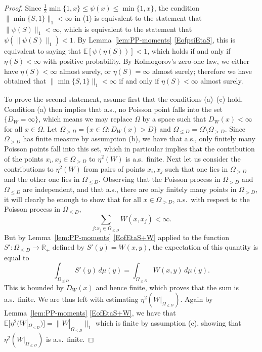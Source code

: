 \documentclass{amsart}
\numberwithin{equation}{section}
\numberwithin{figure}{section}
\theoremstyle{definition}
\theoremstyle{remark}
\newcommand{\EE}{\mathbb{E}}
\newcommand{\RR}{\mathbb{R}}
\begin{document}
\begin{proof}
Since $\frac 12\min\{1,x\}\leq \psi(x)\leq \min\{1,x\}$, the condition
$\|\min\{S,1\}\|_1<\infty$ in (1) is equivalent to the statement that
$\|\psi(S)\|_1<\infty$, which is equivalent to the statement that
$\psi(\|\psi(S)\|_1)<1$. By Lemma~\ref{lem:PP-moments} \eqref{EofpsiEtaS},
this is equivalent to saying that $\EE[\psi(\eta(S))]<1$, which holds if and
only if $\eta(S)<\infty$ with positive probability. By Kolmogorov's zero-one
law, we either have $\eta(S)<\infty$ almost surely, or $\eta(S)=\infty$
almost surely; therefore we have obtained that $\|\min\{S,1\}\|_1<\infty$ if
and only if $\eta(S)<\infty$ almost surely.

To prove the second statement, assume first that the conditions (a)--(c)
hold. Condition (a) then implies that a.s., no Poisson point falls into the
set $\{D_W=\infty\}$, which means we may replace $\Omega$ by a space such
that $D_W(x)<\infty$ for all $x\in \Omega$. Let $\Omega_{>D}=\{x\in\Omega:
D_W(x)>D\}$ and $\Omega_{\leq D}=\Omega\setminus\Omega_{>D}$. Since
$\Omega_{>D}$ has finite measure by assumption (b), we have that a.s., only
finitely many Poisson points fall into this set, which in particular implies
that the contribution of the points $x_i,x_j\in \Omega_{>D}$ to $\eta^2(W)$
is a.s.\ finite. Next let us consider the contributions to $\eta^2(W)$ from
pairs of points $x_i,x_j$ such that one lies in $\Omega_{>D}$ and the other
one lies in $\Omega_{\leq D}$. Observing that the Poisson process in
$\Omega_{>D}$ and $\Omega_{\leq D}$ are independent, and that a.s., there are
only finitely many points in $\Omega_{>D}$, it will clearly be enough to show
that for all $x\in \Omega_{>D}$, a.s.\ with respect to the Poisson process in
$\Omega_{\leq D}$,
\[
\sum_{j: x_j\in \Omega_{\leq D}} W(x,x_j)<\infty.
\]
But by Lemma~\ref{lem:PP-moments} \eqref{EofEtaS+W} applied to the function
$S'\colon\Omega_{\leq D} \rightarrow \RR_+$ defined by $S'(y)=W(x,y)$, the
expectation of this quantity is equal to
\[
\int_{\Omega_{\leq D}}S'(y) \,d\mu(y)=\int_{\Omega_{\leq D}}W(x,y)\,d\mu(y).
\]
This is bounded by $D_W(x)$ and hence finite, which proves that the sum is
a.s.\ finite. We are thus left with estimating $\eta^2(W|_{\Omega_{\leq
D}})$. Again by Lemma~\ref{lem:PP-moments} \eqref{EofEtaS+W}, we have that
$\EE[\eta^2(W|_{\Omega_{\leq D}})]=\|W|_{\Omega_{\leq D}}\|_1$ which is
finite by assumption (c), showing that $\eta^2(W|_{\Omega_{\leq D}})$ is
a.s.\ finite.


\end{proof}
\end{document}
